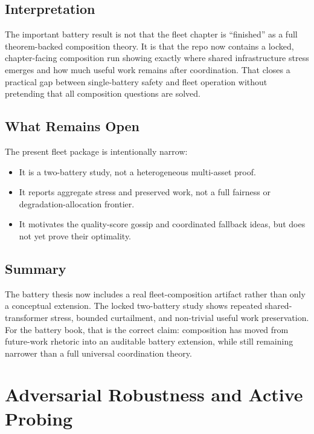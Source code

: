 \subsection{Interpretation}

The important battery result is not that the fleet chapter is ``finished'' as
a full theorem-backed composition theory.  It is that the repo now contains a
locked, chapter-facing composition run showing exactly where shared
infrastructure stress emerges and how much useful work remains after
coordination.  That closes a practical gap between single-battery safety and
fleet operation without pretending that all composition questions are solved.

\subsection{What Remains Open}

The present fleet package is intentionally narrow:

\begin{itemize}
  \item It is a two-battery study, not a heterogeneous multi-asset proof.
  \item It reports aggregate stress and preserved work, not a full fairness or
    degradation-allocation frontier.
  \item It motivates the quality-score gossip and coordinated fallback ideas,
    but does not yet prove their optimality.
\end{itemize}

\subsection{Summary}

The battery thesis now includes a real fleet-composition artifact rather than
only a conceptual extension.  The locked two-battery study shows repeated
shared-transformer stress, bounded curtailment, and non-trivial useful work
preservation.  For the battery book, that is the correct claim: composition
has moved from future-work rhetoric into an auditable battery extension, while
still remaining narrower than a full universal coordination theory.


\section{Adversarial Robustness and Active Probing}
\label{ch:adversarial-robustness}

